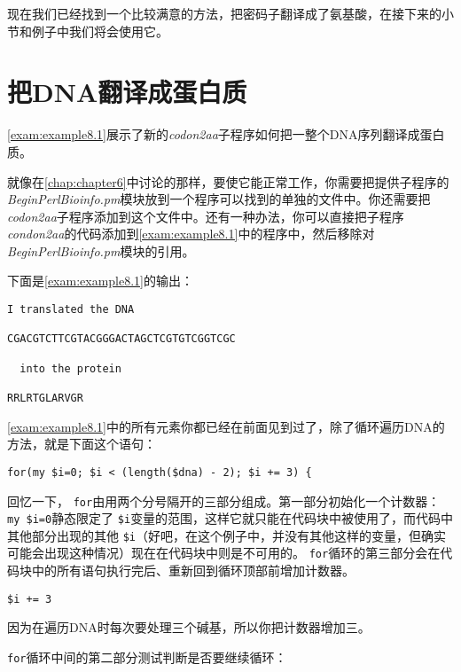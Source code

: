 现在我们已经找到一个比较满意的方法，把密码子翻译成了氨基酸，在接下来的小节和例子中我们将会使用它。

\section{把DNA翻译成蛋白质}
\autoref{exam:example8.1}展示了新的\textit{codon2aa}子程序如何把一整个DNA序列翻译成蛋白质。



就像在\autoref{chap:chapter6}中讨论的那样，要使它能正常工作，你需要把提供子程序的\textit{BeginPerlBioinfo.pm}模块放到一个程序可以找到的单独的文件中。你还需要把\textit{codon2aa}子程序添加到这个文件中。还有一种办法，你可以直接把子程序\textit{condon2aa}的代码添加到\autoref{exam:example8.1}中的程序中，然后移除对\textit{BeginPerlBioinfo.pm}模块的引用。

下面是\autoref{exam:example8.1}的输出：

\begin{lstlisting}
I translated the DNA

CGACGTCTTCGTACGGGACTAGCTCGTGTCGGTCGC

  into the protein

RRLRTGLARVGR
\end{lstlisting}

\autoref{exam:example8.1}中的所有元素你都已经在前面见到过了，除了循环遍历DNA的方法，就是下面这个语句：

\begin{lstlisting}
for(my $i=0; $i < (length($dna) - 2); $i += 3) {
\end{lstlisting}

回忆一下， \verb|for|由用两个分号隔开的三部分组成。第一部分初始化一个计数器： \verb|my $i=0|静态限定了 \verb|$i|变量的范围，这样它就只能在代码块中被使用了，而代码中其他部分出现的其他 \verb|$i|（好吧，在这个例子中，并没有其他这样的变量，但确实可能会出现这种情况）现在在代码块中则是不可用的。 \verb|for|循环的第三部分会在代码块中的所有语句执行完后、重新回到循环顶部前增加计数器。

\begin{lstlisting}
$i += 3
\end{lstlisting}

因为在遍历DNA时每次要处理三个碱基，所以你把计数器增加三。

 \verb|for|循环中间的第二部分测试判断是否要继续循环：

